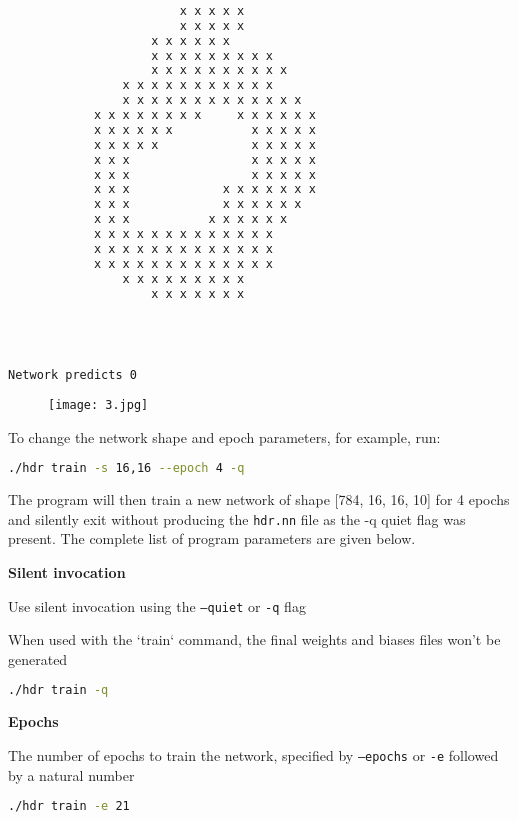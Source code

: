 \begin{lstlisting}[language=Bash]



						x x x x x
						x x x x x
					x x x x x x
					x x x x x x x x x
					x x x x x x x x x x
				x x x x x x x x x x x
				x x x x x x x x x x x x x
			x x x x x x x x     x x x x x x
			x x x x x x           x x x x x
			x x x x x             x x x x x
			x x x                 x x x x x
			x x x                 x x x x x
			x x x             x x x x x x x
			x x x             x x x x x x
			x x x           x x x x x x
			x x x x x x x x x x x x x
			x x x x x x x x x x x x x
			x x x x x x x x x x x x x
				x x x x x x x x x
					x x x x x x x




Network predicts 0
\end{lstlisting}

\begin{figure}[h]
	\centering
	\texttt{[image: 3.jpg]}
\end{figure}

To change the network shape and epoch parameters, for example, run:

\begin{lstlisting}[language=Bash]
	./hdr train -s 16,16 --epoch 4 -q
\end{lstlisting}

The program will then train a new network of shape [784, 16, 16, 10] for 4 epochs and silently exit without producing the \texttt{hdr.nn} file as the -q quiet flag was present. The complete list of program parameters are given below.

\textbf{Silent invocation}

Use silent invocation using the \texttt{--quiet} or \texttt{-q} flag

When used with the `train` command, the final weights and biases files won't be generated

\begin{lstlisting}[language=Bash]
	./hdr train -q
\end{lstlisting}

\textbf{Epochs}

The number of epochs to train the network, specified by \texttt{--epochs} or \texttt{-e} followed by a natural number

\begin{lstlisting}[language=Bash]
	./hdr train -e 21
\end{lstlisting}

